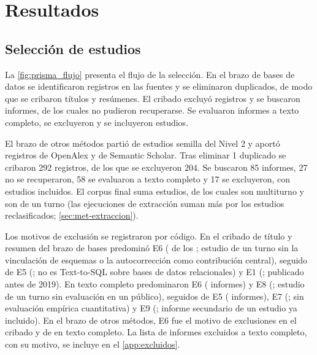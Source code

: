 \section{Resultados}
\label{sec:resultados}

\subsection{Selección de estudios}
\label{sec:res-seleccion}



La \cref{fig:prisma_flujo} presenta el flujo de la selección. En el brazo de bases de datos se identificaron \nIdentificados{} registros en las \nBases{} fuentes y se eliminaron \nDuplicados{} duplicados, de modo que se cribaron \nCribados{} títulos y resúmenes. El cribado excluyó \nExcluidosCribado{} registros y se buscaron \nBuscados{} informes, de los cuales \nNoRecuperados{} no pudieron recuperarse. Se evaluaron \nEvaluados{} informes a texto completo, se excluyeron \nExcluidosTexto{} y se incluyeron \nIncluidosBases{} estudios.

El brazo de otros métodos partió de \nBolaSemillas{} estudios semilla del Nivel 2 y aportó \nBolaCandOA{} registros de OpenAlex y \nBolaCandSS{} de Semantic Scholar. Tras eliminar 1 duplicado se cribaron 292 registros, de los que se excluyeron 204. Se buscaron 85 informes, 27 no se recuperaron, 58 se evaluaron a texto completo y 17 se excluyeron, con \nIncluidosBola{} estudios incluidos. El corpus final suma \nEstudios{} estudios, de los cuales \nMultiturno{} son multiturno y \nUnTurno{} son de un turno (las ejecuciones de extracción suman más por los estudios reclasificados; \cref{sec:met-extraccion}).

Los motivos de exclusión se registraron por código. En el cribado de título y resumen del brazo de bases predominó E6 (\nExclTRBasesESeis{} de los \nExcluidosCribado{}; estudio de un turno sin la vinculación de esquemas o la autocorrección como contribución central), seguido de E5 (\nExclTRBasesECinco{}; no es Text-to-SQL sobre bases de datos relacionales) y E1 (\nExclTRBasesEUno{}; publicado antes de 2019). En texto completo predominaron E6 (\nExclTCBasesESeis{} informes) y E8 (\nExclTCBasesEOcho{}; estudio de un turno sin evaluación en un  público), seguidos de E5 (\nExclTCBasesECinco{} informes), E7 (\nExclTCBasesESiete{}; sin evaluación empírica cuantitativa) y E9 (\nExclTCBasesENueve{}; informe secundario de un estudio ya incluido). En el brazo de otros métodos, E6 fue el motivo de \nExclTROtrosESeis{} exclusiones en el cribado y de \nExclTCOtrosESeis{} en texto completo. La lista de informes excluidos a texto completo, con su motivo, se incluye en el \cref{app:excluidos}.

